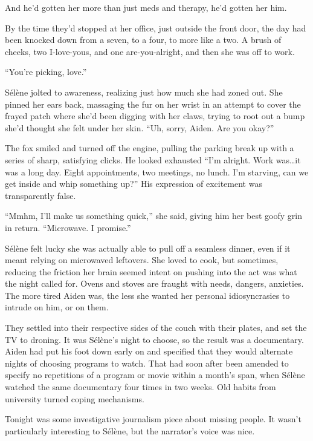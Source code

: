 And he'd gotten her more than just meds and therapy, he'd gotten her him.

By the time they'd stopped at her office, just outside the front door, the day had been knocked down from a seven, to a four, to more like a two. A brush of cheeks, two I-love-yous, and one are-you-alright, and then she was off to work.

\secdiv{}

\noindent ``You're picking, love.''

Sélène jolted to awareness, realizing just how much she had zoned out. She pinned her ears back, massaging the fur on her wrist in an attempt to cover the frayed patch where she'd been digging with her claws, trying to root out a bump she'd thought she felt under her skin. ``Uh, sorry, Aiden. Are you okay?''

The fox smiled and turned off the engine, pulling the parking break up with a series of sharp, satisfying clicks. He looked exhausted ``I'm alright. Work was\ldots{}it was a long day. Eight appointments, two meetings, no lunch. I'm starving, can we get inside and whip something up?'' His expression of excitement was transparently false.

``Mmhm, I'll make us something quick,'' she said, giving him her best goofy grin in return. ``Microwave. I promise.''

Sélène felt lucky she was actually able to pull off a seamless dinner, even if it meant relying on microwaved leftovers. She loved to cook, but sometimes, reducing the friction her brain seemed intent on pushing into the act was what the night called for. Ovens and stoves are fraught with needs, dangers, anxieties. The more tired Aiden was, the less she wanted her personal idiosyncrasies to intrude on him, or on them.

They settled into their respective sides of the couch with their plates, and set the TV to droning. It was Sélène's night to choose, so the result was a documentary. Aiden had put his foot down early on and specified that they would alternate nights of choosing programs to watch. That had soon after been amended to specify no repetitions of a program or movie within a month's span, when Sélène watched the same documentary four times in two weeks. Old habits from university turned coping mechanisms.

Tonight was some investigative journalism piece about missing people. It wasn't particularly interesting to Sélène, but the narrator's voice was nice.


